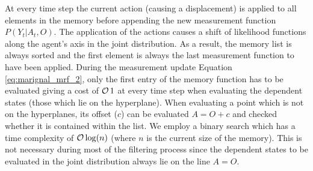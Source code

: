 At every time step the current action (causing a displacement) is applied to all elements in the memory before appending the new 
measurement function $P(Y_t|A_t,O)$. The application of the actions causes a shift of likelihood functions along the agent's axis
in the joint distribution. As a result, the memory list is always sorted and the first element is always the last measurement function
to have been applied. 
During the measurement update Equation \ref{eq:marignal_mrf_2}, only the first entry of the memory function has to be evaluated
giving a cost of $\operatorname{\mathcal{O}}{1}$ at every time step when evaluating the dependent states (those which lie on the hyperplane). When
evaluating a point which is not on the hyperplanes, its offset ($c$) can be evaluated $A=O+c$ and checked whether it is contained
within the list. We employ a binary search which has a time complexity of $\operatorname{\mathcal{O}}{\log(n)}$ (where $n$ is the current size of the memory). This is not necessary during most
of the filtering process since the dependent states to be evaluated in the joint distribution always lie on the line $A=O$.
